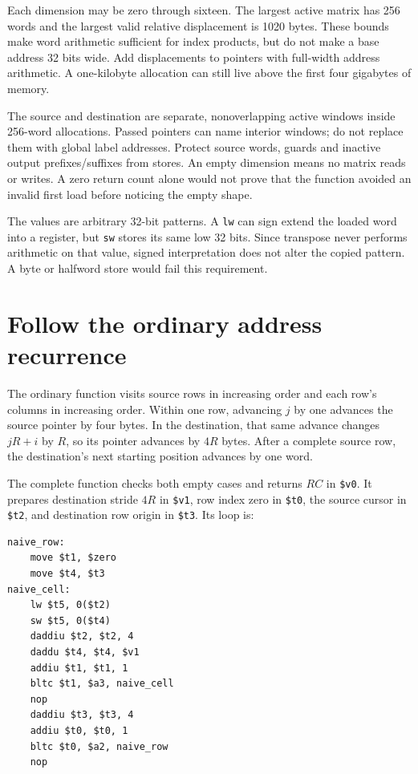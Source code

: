 

Each dimension may be zero through sixteen. The largest active matrix has 256
words and the largest valid relative displacement is 1020 bytes. These bounds
make word arithmetic sufficient for index products, but do not make a base address
32 bits wide. Add displacements to pointers with full-width address arithmetic.
A one-kilobyte allocation can still live above the first four gigabytes of memory.

The source and destination are separate, nonoverlapping active windows inside
256-word allocations. Passed pointers can name interior windows; do not replace
them with global label addresses. Protect source words, guards and inactive output
prefixes/suffixes from stores. An empty dimension means no matrix reads or writes.
A zero return count alone would not prove that the function avoided an invalid
first load before noticing the empty shape.

The values are arbitrary 32-bit patterns. A \texttt{lw} can sign extend the loaded
word into a register, but \texttt{sw} stores its same low 32 bits. Since transpose
never performs arithmetic on that value, signed interpretation does not alter the
copied pattern. A byte or halfword store would fail this requirement.

\section{Follow the ordinary address recurrence}

The ordinary function visits source rows in increasing order and each row's
columns in increasing order. Within one row, advancing $j$ by one advances the
source pointer by four bytes. In the destination, that same advance changes
$jR+i$ by $R$, so its pointer advances by $4R$ bytes. After a complete source row,
the destination's next starting position advances by one word.

The complete function checks both empty cases and returns $RC$ in
\texttt{\$v0}. It prepares destination stride $4R$ in \texttt{\$v1}, row index
zero in \texttt{\$t0}, the source cursor in \texttt{\$t2}, and destination row
origin in \texttt{\$t3}. Its loop is:

\noindent\begin{minipage}{\linewidth}
  \begin{verbatim}
naive_row:
    move $t1, $zero
    move $t4, $t3
naive_cell:
    lw $t5, 0($t2)
    sw $t5, 0($t4)
    daddiu $t2, $t2, 4
    daddu $t4, $t4, $v1
    addiu $t1, $t1, 1
    bltc $t1, $a3, naive_cell
    nop
    daddiu $t3, $t3, 4
    addiu $t0, $t0, 1
    bltc $t0, $a2, naive_row
    nop
\end{verbatim}
\end{minipage}

